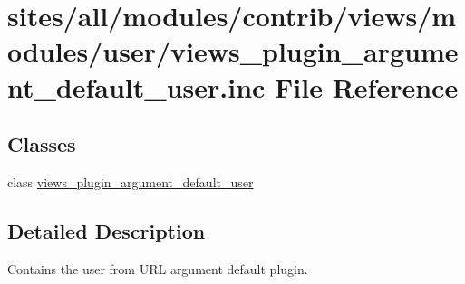 \hypertarget{views__plugin__argument__default__user_8inc}{
\section{sites/all/modules/contrib/views/modules/user/views\_\-plugin\_\-argument\_\-default\_\-user.inc File Reference}
\label{views__plugin__argument__default__user_8inc}
}
\subsection*{Classes}
\begin{CompactItemize}
\item 
class \hyperlink{classviews__plugin__argument__default__user}{views\_\-plugin\_\-argument\_\-default\_\-user}
\end{CompactItemize}


\subsection{Detailed Description}
Contains the user from URL argument default plugin. 